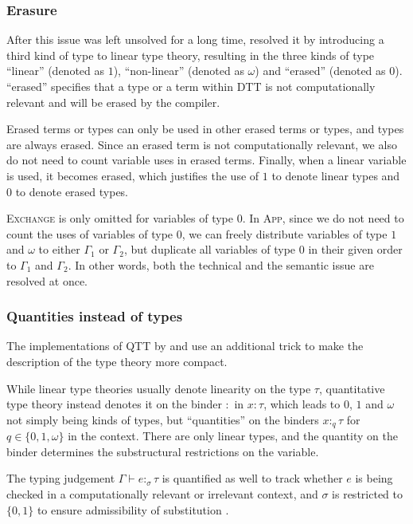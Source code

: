 \subsubsection{Erasure}
After this issue was left unsolved for a long time, \cite{lindley_i_2016} resolved it by introducing a third kind of type to linear type theory, resulting in the three kinds of type ``linear'' (denoted as $1$), ``non-linear'' (denoted as $\omega$) and ``erased'' (denoted as $0$). ``erased'' specifies that a type or a term within DTT is not computationally relevant and will be erased by the compiler. 

Erased terms or types can only be used in other erased terms or types, and types are always erased. Since an erased term is not computationally relevant, we also do not need to count variable uses in erased terms. Finally, when a linear variable is used, it becomes erased, which justifies the use of $1$ to denote linear types and $0$ to denote erased types. 

\textsc{Exchange} is only omitted for variables of type $0$. In \textsc{App}, since we do not need to count the uses of variables of type $0$, we can freely distribute variables of type $1$ and $\omega$ to either $\Gamma_1$ or $\Gamma_2$, but duplicate all variables of type $0$ in their given order to $\Gamma_1$ and $\Gamma_2$. In other words, both the technical and the semantic issue are resolved at once.

\subsubsection{Quantities instead of types}
The implementations of QTT by \cite{lindley_i_2016} and \cite{atkey_syntax_2018} use an additional trick to make the description of the type theory more compact. 

While linear type theories usually denote linearity on the type $\tau$, quantitative type theory instead denotes it on the binder $:$ in $x : \tau$, which leads to $0$, $1$ and $\omega$ not simply being kinds of types, but ``quantities'' on the binders $x :_q \tau$ for $q \in \{0, 1, \omega\}$ in the context. There are only linear types, and the quantity on the binder determines the substructural restrictions on the variable. 

The typing judgement $\Gamma \vdash e :_\sigma \tau$ is quantified as well to track whether $e$ is being checked in a computationally relevant or irrelevant context, and $\sigma$ is restricted to $\{0, 1\}$ to ensure admissibility of substitution \citep{atkey_syntax_2018}. 

